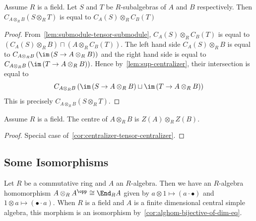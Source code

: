 \begin{corollary}\label{cor:centralizer-tensor-centralizer}
  Assume $R$ is a field. Let $S$ and $T$ be $R$-subalgebras of $A$ and $B$
  respectively. Then $C_{A\otimes_{R}B}\left(S\otimes_{R}T\right)$ is equal to
  $C_{A}(S)\otimes_{R}C_{B}(T)$
  \leanok
\end{corollary}
\begin{proof}
  From~\cref{lem:submodule-tensor-submodule}, $C_{A}(S)\otimes_{R}C_{B}(T)$ is
  equal to
  $\left(C_{A}(S)\otimes_{R} B\right)\sqcap \left(A\otimes_{R}C_{B}(T)\right)$.
  The left hand side $C_{A}(S)\otimes_{R} B$ is equal to
  $C_{A\otimes_{R}B}\left(\im\left(S\to A\otimes_{R}B\right)\right)$ and the
  right hand side is equal to
  $C_{A\otimes_{R}B}\left(\im\left(T\to A\otimes_{R}B\right)\right)$. Hence
  by~\cref{lem:sup-centralizer}, their intersection is equal to
  \[C_{A\otimes_{R}B}\left(\im\left(S\to A\otimes_{R} B\right)\sqcup \im\left(T\to A\otimes_{R}B\right)\right)\]
  This is precisely $C_{A\otimes_{R}B}\left(S\otimes_{R}T\right)$.
\end{proof}

\begin{corollary}
  \label{cor:center-tensor-center}
  Assume $R$ is a field. The centre of $A\otimes_{R} B$ is
  $Z\left(A\right)\otimes_{R}Z\left(B\right)$. 
  \leanok
\end{corollary}
\begin{proof}
  Special case of~\cref{cor:centralizer-tensor-centralizer}.
\end{proof}

\subsection{Some Isomorphisms}

\begin{construction}
  \label{con:self-tensor-opp-iso-end}
  Let $R$ be a commutative ring and $A$ an $R$-algebra. Then we
  have an $R$-algebra homomorphism $A\otimes_{R}A^{\opp} \cong \End_{R}A$ given
  by $a\otimes 1 \mapsto (a\cdot\bullet)$ and
  $1\otimes a \mapsto (\bullet\cdot a)$. When $R$ is a field and $A$ is a finite dimensional central simple algebra, this morphism is an isomorphism by~\cref{cor:alghom-bijective-of-dim-eq}.
\end{construction}

